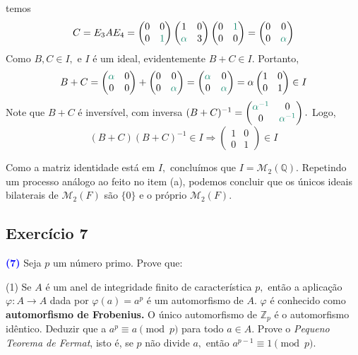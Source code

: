 \documentclass[11pt,a4paper]{article}
\newcommand{\exercicio}[1]{\subsection{Exercício #1} \textcolor{blue}{\bf(#1)}}
\newcommand{\dividiritens}[1]{\begin{tasks}[counter-format={(tsk[a])},label-width=3.6ex, label-format = {\bfseries}, column-sep = {0pt}](1) #1 \end{tasks}}
\newcommand{\pers}[1]{\textcolor{Floresta}{$\negrito{(#1)} $}}
\begin{document}
{{\[\]
temos
\[
C = E_3AE_4 = \begin{pmatrix} 0 & 0 \\ 0 & \textcolor{PineGreen}{1} \end{pmatrix}  \begin{pmatrix} 1 & 0 \\ \textcolor{PineGreen}{\alpha} & 3 \end{pmatrix}  \begin{pmatrix}  0 & \textcolor{PineGreen}{1} \\ 0 & 0 \end{pmatrix} = \begin{pmatrix} 0 & 0 \\ 0 & \textcolor{PineGreen}{\alpha} \end{pmatrix}
\]
Como $B, C \in I,$ e $I$ é um ideal, evidentemente $B + C \in I.$ Portanto,
\[
B + C = \begin{pmatrix} \textcolor{PineGreen}{\alpha} & 0 \\ 0 & 0 \end{pmatrix} + \begin{pmatrix} 0 & 0 \\ 0 & \textcolor{PineGreen}{\alpha} \end{pmatrix} = \begin{pmatrix} \textcolor{PineGreen}{\alpha} & 0 \\ 0 & \textcolor{PineGreen}{\alpha} \end{pmatrix} = \alpha \begin{pmatrix} 1 & 0 \\ 0 & 1 \end{pmatrix} \in I
\]
Note que $B + C$ é inversível, com inversa $(B + C)^{-1} = \begin{pmatrix} \textcolor{PineGreen}{\alpha^{-1}} & 0 \\ 0 & \textcolor{PineGreen}{\alpha^{-1}} \end{pmatrix}.$ Logo,
\[
(B + C)(B + C)^{-1} \in I \Rightarrow  \begin{pmatrix} 1 & 0 \\ 0 & 1 \end{pmatrix} \in I
\]

Como a matriz identidade está em $I,$ concluímos que $I = \mathcal{M}_2(\mathbb{Q}).$
\task[\pers{b}] 
\task[\pers{c}] Repetindo um processo análogo ao feito no item (a), podemos concluir que os únicos ideais bilaterais de $\mathcal{M}_2(F)$ são $\{ 0\}$ e o próprio $\mathcal{M}_2(F)$.
}
}
\exercicio{7} Seja $p$ um número primo. Prove que:\dividiritens{
\task[\pers{a}] Se $A$ é um anel de integridade finito de característica $p,$ então a aplicação $\varphi \colon A \to A$ dada por $\varphi(a) = a^p$ é um automorfismo de $A.$  $\varphi$ é conhecido como \textbf{automorfismo de Frobenius.}
\task[\pers{b}] O único automorfismo de $\mathbb{Z}_p$ é o automorfismo idêntico. Deduzir que a $a^p \equiv a \pmod p$ para todo $a \in A.$
\task[\pers{c}] Prove o \emph{Pequeno Teorema de Fermat}, isto é, se $p$ não divide $a,$ então $a^{p-1} \equiv 1 \pmod p.$
}
\end{document}
